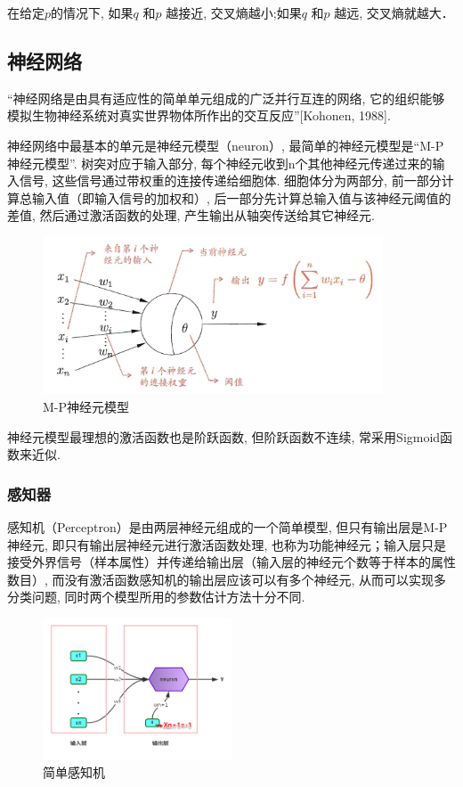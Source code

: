 \documentclass[a4paper]{article}
\theoremstyle{definition}
\numberwithin{equation}{section}
\begin{document}
在给定$p$的情况下, 如果$q$ 和$p$ 越接近, 交叉熵越小;如果$q$ 和$p$ 越远, 交叉熵就越大．


\subsection{神经网络}
“神经网络是由具有适应性的简单单元组成的广泛并行互连的网络, 它的组织能够模拟生物神经系统对真实世界物体所作出的交互反应”[Kohonen,  1988].

神经网络中最基本的单元是神经元模型（neuron）, 最简单的神经元模型是“M-P神经元模型”.
树突对应于输入部分, 每个神经元收到n个其他神经元传递过来的输入信号, 这些信号通过带权重的连接传递给细胞体.
细胞体分为两部分, 前一部分计算总输入值（即输入信号的加权和）, 后一部分先计算总输入值与该神经元阈值的差值, 然后通过激活函数的处理, 产生输出从轴突传送给其它神经元.
\begin{figure}
    \centering
    \label{MP_Model}
    \includegraphics[width=0.9\textwidth]{MP_Modle.png}
    \caption{M-P神经元模型}
\end{figure}

神经元模型最理想的激活函数也是阶跃函数, 但阶跃函数不连续, 常采用Sigmoid函数来近似.

\subsubsection{感知器}
感知机（Perceptron）是由两层神经元组成的一个简单模型, 但只有输出层是M-P神经元, 即只有输出层神经元进行激活函数处理, 也称为功能神经元；输入层只是接受外界信号（样本属性）并传递给输出层（输入层的神经元个数等于样本的属性数目）, 而没有激活函数感知机的输出层应该可以有多个神经元, 从而可以实现多分类问题, 同时两个模型所用的参数估计方法十分不同.

\begin{figure}
    \centering
    \label{MP}
    \includegraphics[width=0.5\textwidth]{simple_perceptron.png}
    \caption{简单感知机}
\end{figure}
\newpage
\end{document}
